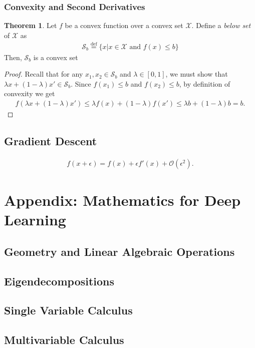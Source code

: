 \documentclass[a4paper,12pt]{article}
\theoremstyle{definition}
\newtheorem*{theorem}{Theorem}
\begin{document}
\subsubsection*{Convexity and Second Derivatives}

\begin{theorem}
    Let $f$ be a convex function over a convex set $\mathcal{X}$. Define a \emph{below set} of $\mathcal{X}$ as
    \begin{align*}
        \mathcal{S}_b \stackrel{\mathrm{def}}{=} \{x | x \in \mathcal{X} \text{ and } f(x) \leq b\}
    \end{align*}
    Then, $\mathcal{S}_b$ is a convex set
    \begin{proof}
        Recall that for any $x_1, x_2 \in \mathcal{S}_b$ and $\lambda \in [0, 1]$, we must show that $\lambda x + (1-\lambda) x' \in \mathcal{S}_b$.
        Since $f(x_1) \leq b$ and $f(x_2) \leq b$, by definition of convexity we get
        \begin{align*}
            f(\lambda x + (1-\lambda) x') \leq \lambda f(x) + (1-\lambda) f(x') \leq \lambda b + (1-\lambda) b = b.
        \end{align*}
    \end{proof}
\end{theorem}

\subsection{Gradient Descent}
\begin{align*}
    f(x + \epsilon) = f(x) + \epsilon f'(x) + \mathcal{O}(\epsilon^2).
\end{align*}

\section{Appendix: Mathematics for Deep Learning}
\subsection{Geometry and Linear Algebraic Operations}
\subsection{Eigendecompositions}
\subsection{Single Variable Calculus}
\subsection{Multivariable Calculus}
\end{document}
